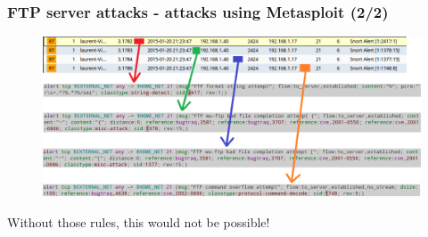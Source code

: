 \documentclass{beamer}
\begin{document}
\begin{frame}
\frametitle{FTP server attacks - attacks using Metasploit (2/2)}
\begin{figure}
   \includegraphics[width= 1\linewidth]{../images/VM_FTP_7.png}
\end{figure}
Without those rules, this would not be possible!
\end{frame}
\end{document}

